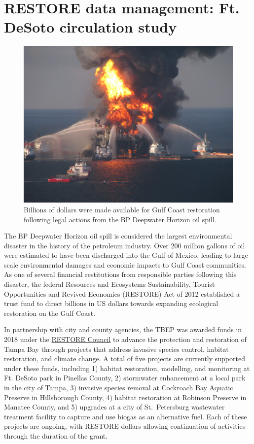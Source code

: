 \documentclass[
]{book}
\begin{document}
\hypertarget{desoto}{%
\section{RESTORE data management: Ft. DeSoto circulation study}\label{desoto}}

\begin{figure}

{\centering \includegraphics[width=0.7\linewidth]{img/deepwater} 

}

\caption{Billions of dollars were made available for Gulf Coast restoration following legal actions from the BP Deepwater Horizon oil spill.}\label{fig:unnamed-chunk-13}
\end{figure}

The BP Deepwater Horizon oil spill is considered the largest environmental disaster in the history of the petroleum industry. Over 200 million gallons of oil were estimated to have been discharged into the Gulf of Mexico, leading to large-scale environmental damages and economic impacts to Gulf Coast communities. As one of several financial restitutions from responsible parties following this disaster, the federal Resources and Ecosystems Sustainability, Tourist Opportunities and Revived Economies (RESTORE) Act of 2012 established a trust fund to direct billions in US dollars towards expanding ecological restoration on the Gulf Coast.

In partnership with city and county agencies, the TBEP was awarded funds in 2018 under the \href{https://www.restorethegulf.gov/}{RESTORE Council} to advance the protection and restoration of Tampa Bay through projects that address invasive species control, habitat restoration, and climate change. A total of five projects are currently supported under these funds, including 1) habitat restoration, modelling, and monitoring at Ft. DeSoto park in Pinellas County, 2) stormwater enhancement at a local park in the city of Tampa, 3) invasive species removal at Cockroach Bay Aquatic Preserve in Hillsborough County, 4) habitat restoration at Robinson Preserve in Manatee County, and 5) upgrades at a city of St.~Petersburg wastewater treatment facility to capture and use biogas as an alternative fuel. Each of these projects are ongoing, with RESTORE dollars allowing continuation of activities through the duration of the grant.
\end{document}
